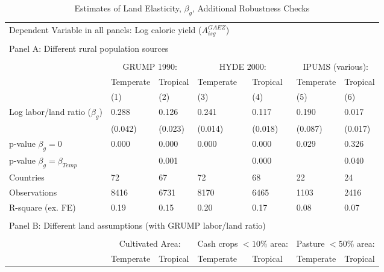 \documentclass[12pt]{article}
\begin{document}
\clearpage

\begin{table}[!htb]
\begin{center}
\caption{Estimates of Land Elasticity, $\beta_g$, Additional Robustness Checks}
\label{TAB_beta_robust}
{\footnotesize
\begin{tabularx}{\textwidth}{lXXXXXX}
\midrule
\multicolumn{7}{l}{Dependent Variable in all panels: Log caloric yield ($A^{GAEZ}_{isg}$)} \\ \\
\multicolumn{7}{l}{Panel A: Different rural population sources} \\ \\
 & \multicolumn{2}{c}{GRUMP 1990:} & \multicolumn{2}{c}{HYDE 2000:} & \multicolumn{2}{c}{IPUMS (various):}\\ \cmidrule(lr){2-3} \cmidrule(lr){4-5} \cmidrule(lr){6-7} 
 & Temperate & Tropical & Temperate  & Tropical  & Temperate  & Tropical \\
 & (1) & (2) & (3) & (4) & (5) & (6) \\
\midrule
Log labor/land ratio ($\beta_g$)&       0.288&       0.126&       0.241&       0.117&       0.190&       0.017\\
                    &     (0.042)&     (0.023)&     (0.014)&     (0.018)&     (0.087)&     (0.017)\\
\midrule
p-value $\beta_g=0$ &       0.000&       0.000&       0.000&       0.000&       0.029&       0.326\\
p-value $\beta_g=\beta_{Temp}$&            &       0.001&            &       0.000&            &       0.040\\
Countries           &          72&          67&          72&          68&          22&          24\\
Observations        &        8416&        6731&        8170&        6465&        1103&        2416\\
R-square (ex. FE)   &        0.19&        0.15&        0.20&        0.17&        0.08&        0.07\\
\midrule
\\
\multicolumn{7}{l}{Panel B: Different land assumptions (with GRUMP labor/land ratio)} \\ \\
 & \multicolumn{2}{c}{Cultivated Area:} & \multicolumn{2}{c}{Cash crops $<10\%$ area:} & \multicolumn{2}{c}{Pasture $<50\%$ area:}\\ \cmidrule(lr){2-3} \cmidrule(lr){4-5} \cmidrule(lr){6-7}
 & Temperate & Tropical & Temperate  & Tropical  & Temperate  & Tropical \\

\end{tabularx}}
\end{center}
\end{table}
\end{document}
